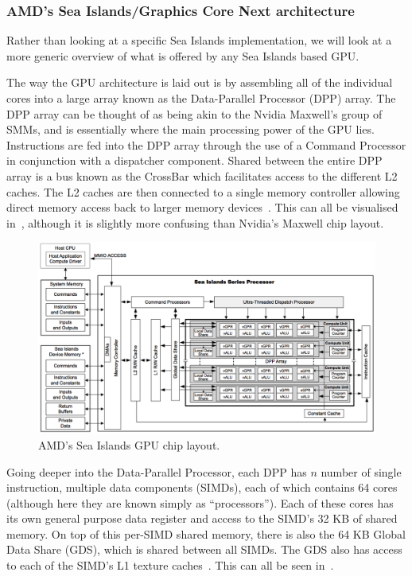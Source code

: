 \documentclass[a4paper,11pt]{article}
\begin{document}
\subsubsection{AMD's Sea Islands/Graphics Core Next architecture} %
\label{ssub:amd_s_sea_islands_graphics_core_next_architecture}
Rather than looking at a specific Sea Islands implementation, we will look at a more generic overview of what is offered
by any Sea Islands based GPU.

The way the GPU architecture is laid out is by assembling all of the individual cores into a large array known as the
Data-Parallel Processor (DPP) array. The DPP array can be thought of as being akin to the Nvidia Maxwell's group of SMMs,
and is essentially where the main processing power of the GPU lies. Instructions are fed into the DPP array through the
use of a Command Processor in conjunction with a dispatcher component. Shared between the entire DPP array is a bus known
as the CrossBar which facilitates access to the different L2 caches.
The L2 caches are then
connected to a single memory controller allowing direct memory access back to larger memory devices~\cite{reference:AMDSeaIslandsISA}.
This can all be visualised in~, although it is slightly more confusing than Nvidia's Maxwell
chip layout.

\begin{figure}[ht]
  \centering
  \includegraphics[scale=0.3]{img/sea-islands-chip}
  \caption{AMD's Sea Islands GPU chip layout.~\cite{reference:AMDSeaIslandsISA}}
\label{fig:sea-islands-chip}
\end{figure}

Going deeper into the Data-Parallel Processor, each DPP has $n$ number of single instruction, multiple data components
(SIMDs), each of which contains 64 cores (although here they are known simply as ``processors''). Each of these cores has
its own general purpose data register and access to the SIMD's 32 KB of shared memory. On top of this per-SIMD shared memory,
there is also the 64 KB Global Data Share (GDS), which is shared between all SIMDs. The GDS also has access to each
of the SIMD's L1 texture caches~\cite{reference:AMDSeaIslandsISA}. This can all be seen in~.
\end{document}
